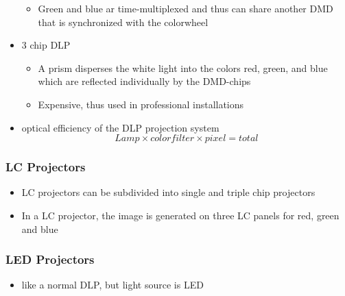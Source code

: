 \documentclass{standalone}
\begin{document}
\begin{itemize}
\begin{itemize}
\item Green and blue ar time-multiplexed and thus can share another DMD that is synchronized with the colorwheel
\end{itemize}
\item 3 chip DLP
\begin{itemize}
\item A prism disperses the white light into the colors red, green, and blue which are reflected individually by the DMD-chips
\item Expensive, thus used in professional installations
\end{itemize}
\item optical efficiency of the DLP projection system $$ Lamp \times colorfilter \times pixel = total$$
\end{itemize}
\subsubsection*{LC Projectors}
\begin{itemize}
\item LC projectors can be subdivided into single and triple chip projectors
\item In a LC projector, the image is generated on three LC panels for red, green and blue
\end{itemize}
\subsubsection*{LED Projectors}
\begin{itemize}
\item like a normal DLP, but light source is LED
\end{itemize}
\end{document}
